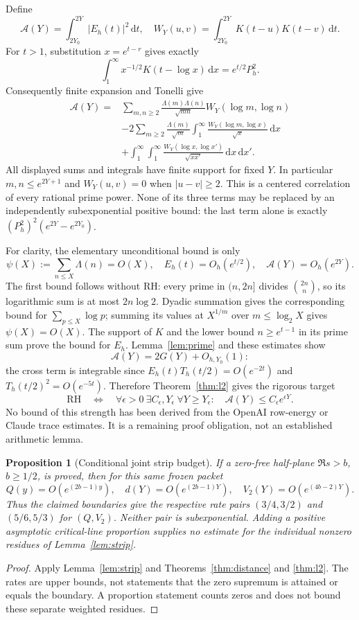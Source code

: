 \documentclass[11pt]{article}
\newtheorem{proposition}[theorem]{Proposition}
\theoremstyle{remark}\newtheorem{remark}[theorem]{Remark}
\newcommand{\dd}{\,\mathrm d}
\begin{document}
Define
\[
 \mathcal A(Y)=\int_{2Y_0}^{2Y}|E_h(t)|^2\dd t,\quad
 W_Y(u,v)=\int_{2Y_0}^{2Y}K(t-u)K(t-v)\dd t.
\]
For $t>1$, substitution $x=e^{t-r}$ gives exactly
\[
 \int_1^\infty x^{-1/2}K(t-\log x)\dd x=e^{t/2}P_h^2.
\]
Consequently finite expansion and Tonelli give
\begin{align*}
 \mathcal A(Y)={}&
 \sum_{m,n\ge2}\frac{\Lambda(m)\Lambda(n)}{\sqrt{mn}}
       W_Y(\log m,\log n)\\
 &-2\sum_{m\ge2}\frac{\Lambda(m)}{\sqrt m}
       \int_1^\infty\frac{W_Y(\log m,\log x)}{\sqrt x}\dd x\\
 &+\int_1^\infty\int_1^\infty
       \frac{W_Y(\log x,\log x')}{\sqrt{xx'}}\dd x\dd x'.
\end{align*}
All displayed sums and integrals have finite support for fixed $Y$.
In particular $m,n\le e^{2Y+1}$ and $W_Y(u,v)=0$ when $|u-v|\ge2$.
This is a centered correlation of every rational prime power.
None of its three terms may be replaced by an independently
subexponential positive bound: the last term alone is exactly
$(P_h^2)^2(e^{2Y}-e^{2Y_0})$.

For clarity, the elementary unconditional bound is only
\[
 \psi(X):=\sum_{n\le X}\Lambda(n)=O(X),\quad
 E_h(t)=O_h(e^{t/2}),\quad\mathcal A(Y)=O_h(e^{2Y}).
\]
The first bound follows without RH: every prime in $(n,2n]$
divides $\binom{2n}{n}$, so its logarithmic sum is at most
$2n\log2$. Dyadic summation gives the corresponding bound for
$\sum_{p\le X}\log p$; summing its values at $X^{1/m}$ over
$m\le\log_2 X$ gives $\psi(X)=O(X)$.
The support of $K$ and the lower bound $n\ge e^{t-1}$ in its
prime sum prove the bound for $E_h$.
Lemma~\ref{lem:prime} and these estimates show
\[
 \mathcal A(Y)=2G(Y)+O_{h,Y_0}(1):
\]
the cross term is integrable since
$E_h(t)T_h(t/2)=O(e^{-2t})$ and $T_h(t/2)^2=O(e^{-5t})$.
Therefore Theorem~\ref{thm:l2} gives the rigorous target
\[
 \text{RH}\quad\Longleftrightarrow\quad
 \forall\epsilon>0\ \exists C_\epsilon,Y_\epsilon\
 \forall Y\ge Y_\epsilon:\quad
 \mathcal A(Y)\le C_\epsilon e^{\epsilon Y}.
\]
No bound of this strength has been derived from the OpenAI
row-energy or Claude trace estimates. It is a remaining proof
obligation, not an established arithmetic lemma.

\begin{proposition}[Conditional joint strip budget]\label{prop:budget}
If a zero-free half-plane $\Re s>b$, $b\ge1/2$, is proved,
then for this same frozen packet
\[
 Q(y)=O(e^{(2b-1)y}),\quad
 d(Y)=O(e^{(2b-1)Y}),\quad
 V_2(Y)=O(e^{(4b-2)Y}).
\]
Thus the claimed boundaries give the respective rate pairs
$(3/4,3/2)$ and $(5/6,5/3)$ for $(Q,V_2)$.
Neither pair is subexponential. Adding a positive asymptotic
critical-line proportion supplies no estimate for the
individual nonzero residues of Lemma~\ref{lem:strip}.
\end{proposition}
\begin{proof}
Apply Lemma~\ref{lem:strip} and Theorems~\ref{thm:distance}
and \ref{thm:l2}. The rates are upper bounds, not statements
that the zero supremum is attained or equals the boundary.
A proportion statement counts zeros and does not bound
these separate weighted residues.
\end{proof}
\end{document}

